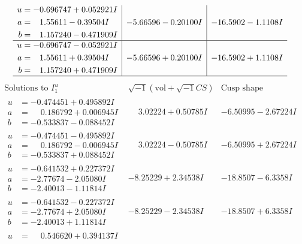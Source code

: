 \documentclass[1p]{elsarticle_modified}
\theoremstyle{definition}
\newcommand{\I}{\sqrt{-1}}
\begin{document}
$$\begin{array}{c|c|c}
\begin{aligned}
u &= -0.696747 + 0.052921 I \\
a &= \phantom{-}1.55611 - 0.39504 I \\
b &= \phantom{-}1.157240 - 0.471909 I\end{aligned}
 & -5.66596 - 0.20100 I & -16.5902 - 1.1108 I \\ \hline\begin{aligned}
u &= -0.696747 - 0.052921 I \\
a &= \phantom{-}1.55611 + 0.39504 I \\
b &= \phantom{-}1.157240 + 0.471909 I\end{aligned}
 & -5.66596 + 0.20100 I & -16.5902 + 1.1108 I\\
 \hline 
 \end{array}$$\newpage$$\begin{array}{c|c|c}  
\text{Solutions to }I^u_{1}& \I (\text{vol} + \sqrt{-1}CS) & \text{Cusp shape}\\
 \hline 
\begin{aligned}
u &= -0.474451 + 0.495892 I \\
a &= \phantom{-}0.186792 + 0.006945 I \\
b &= -0.533837 - 0.088452 I\end{aligned}
 & \phantom{-}3.02224 + 0.50785 I & -6.50995 - 2.67224 I \\ \hline\begin{aligned}
u &= -0.474451 - 0.495892 I \\
a &= \phantom{-}0.186792 - 0.006945 I \\
b &= -0.533837 + 0.088452 I\end{aligned}
 & \phantom{-}3.02224 - 0.50785 I & -6.50995 + 2.67224 I \\ \hline\begin{aligned}
u &= -0.641532 + 0.227372 I \\
a &= -2.77674 - 2.05080 I \\
b &= -2.40013 - 1.11814 I\end{aligned}
 & -8.25229 + 2.34538 I & -18.8507 - 6.3358 I \\ \hline\begin{aligned}
u &= -0.641532 - 0.227372 I \\
a &= -2.77674 + 2.05080 I \\
b &= -2.40013 + 1.11814 I\end{aligned}
 & -8.25229 - 2.34538 I & -18.8507 + 6.3358 I \\ \hline\begin{aligned}
u &= \phantom{-}0.546620 + 0.394137 I \\

\end{aligned}
\end{array}$$
\end{document}
